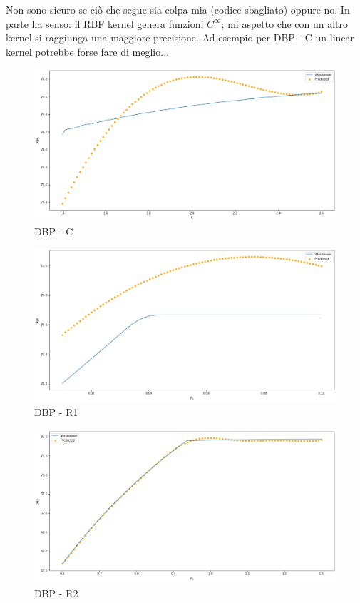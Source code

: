 \newpage
Non sono sicuro se ciò che segue sia colpa mia (codice sbagliato) oppure no. In parte ha senso: il RBF kernel genera funzioni $C^\infty$; mi aspetto che con un altro kernel si raggiunga una maggiore precisione. Ad esempio per DBP - C un linear kernel potrebbe forse fare di meglio...

\begin{figure}[h]
    \centering
    \includegraphics[width=1\textwidth]{images/Training - temp/DBP - C.png}
    \caption{DBP - C}
\end{figure}

\newpage


\begin{figure}[h]
    \centering
    \includegraphics[width=1\textwidth]{images/Training - temp/DBP - R1.png}
    \caption{DBP - R1}
\end{figure}

\newpage


\begin{figure}[h]
    \centering
    \includegraphics[width=1\textwidth]{images/Training - temp/DBP - R2.png}
    \caption{DBP - R2}
\end{figure}

